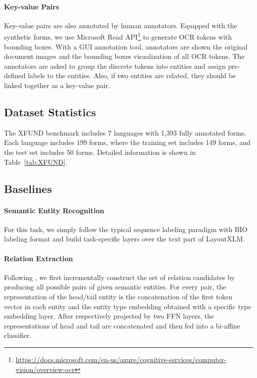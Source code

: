 \documentclass[11pt]{article}
\newcommand{\task}{\textsc{XFUND}\xspace}
\begin{document}
\paragraph{Key-value Pairs}
Key-value pairs are also annotated by human annotators. Equipped with the synthetic forms, we use Microsoft Read API\footnote{\url{https://docs.microsoft.com/en-us/azure/cognitive-services/computer-vision/overview-ocr}} to generate OCR tokens with bounding boxes. With a GUI annotation tool, annotators are shown the original document images and the bounding boxes visualization of all OCR tokens. The annotators are asked to group the discrete tokens into entities and assign pre-defined labels to the entities. Also, if two entities are related, they should be linked together as a key-value pair.

\subsection{Dataset Statistics}
The \task benchmark includes 7 languages with 1,393 fully annotated forms. Each language includes 199 forms, where the training set includes 149 forms, and the test set includes 50 forms. Detailed information is shown in Table~\ref{tab:XFUND}.


\subsection{Baselines}

\paragraph{Semantic Entity Recognition}
For this task, we simply follow the typical sequence labeling paradigm with BIO labeling format and build task-specific layers over the text part of LayoutXLM. 

\paragraph{Relation Extraction}
Following \citet{DBLP:journals/eswa/BekoulisDDD18a} , we first incrementally construct the set of relation candidates by producing all possible pairs of given semantic entities. For every pair, the representation of the head/tail entity is the concatenation of the first token vector in each entity and the entity type embedding obtained with a specific type embedding layer. After respectively projected by two FFN layers, the representations of head and tail are concatenated and then fed into a bi-affine classifier.
\end{document}
